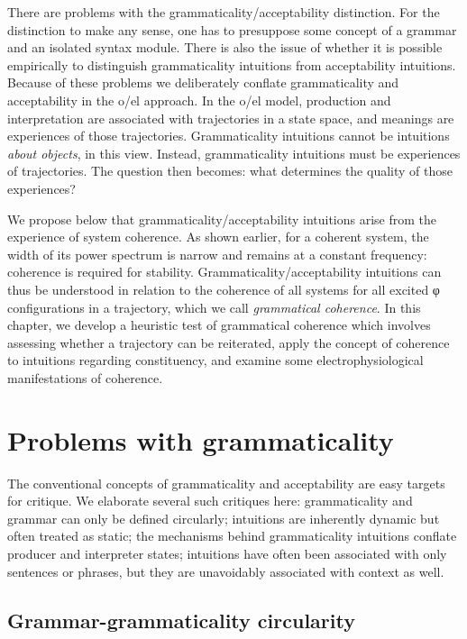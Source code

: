   There are problems with the grammaticality/acceptability distinction. For the distinction to make any sense, one has to presuppose some concept of a grammar and an isolated syntax module. There is also the issue of whether it is possible empirically to distinguish grammaticality intuitions from acceptability intuitions. Because of these problems we deliberately conflate grammaticality and acceptability in the o/el approach. In the o/el model, production and interpretation are associated with trajectories in a state space, and meanings are experiences of those trajectories. Grammaticality intuitions cannot be intuitions \textit{about objects}, in this view. Instead, grammaticality intuitions must be experiences of trajectories. The question then becomes: what determines the quality of those experiences? 

  We propose below that grammaticality/acceptability intuitions arise from the experience of system coherence. As shown earlier, for a coherent system, the width of its power spectrum is narrow and remains at a constant frequency: coherence is required for stability. Grammaticality/acceptability intuitions can thus be understood in relation to the coherence of all systems for all excited φ configurations in a trajectory, which we call \textit{grammatical coherence}. In this chapter, we develop a heuristic test of grammatical coherence which involves assessing whether a trajectory can be reiterated, apply the concept of coherence to intuitions regarding constituency, and examine some electrophysiological manifestations of coherence. 

\section{Problems with grammaticality}

The conventional concepts of grammaticality and acceptability are easy targets for critique. We elaborate several such critiques here: grammaticality and grammar can only be defined circularly; intuitions are inherently dynamic but often treated as static; the mechanisms behind grammaticality intuitions conflate producer and interpreter states; intuitions have often been associated with only sentences or phrases, but they are unavoidably associated with context as well.

\subsection{Grammar-grammaticality circularity}

